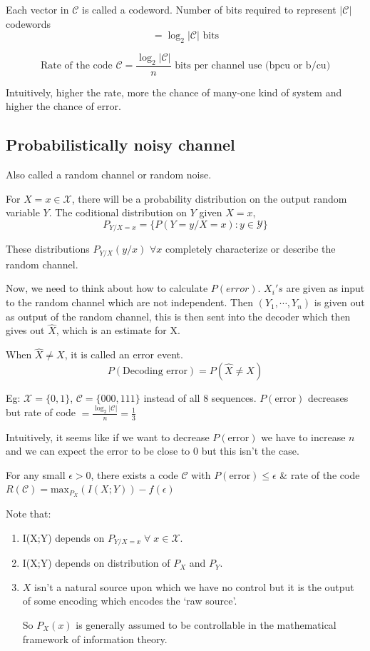 \documentclass{article}
\begin{document}
Each vector in $\mathscr{C}$ is called a codeword. Number of bits required to represent $|\mathscr{C}|$ codewords
$$ = \log_{2} | \mathscr{C} | \text{ bits}$$

$$ \text{Rate of the code } \mathscr{C}= \frac{\log_2 | \mathscr{C}|}{n} \text{ bits per channel use (bpcu or b/cu)}$$

Intuitively, higher the rate, more the chance of many-one kind of system and higher the chance of error.

\subsection{Probabilistically noisy channel}

Also called a random channel or random noise.

For $X=x \in \mathcal{X}$, there will be a probability distribution on the output random variable $Y$. The coditional distribution on $Y$ given $X=x$,
$$ P_{Y/X=x}= \{ P(Y=y/X=x):y \in \mathcal{Y}\}$$

These distributions $P_{Y/X}(y/x)$ $\forall x$ completely characterize or describe the random channel.

Now, we need to think about how to calculate $P(error)$. $X_i's$ are given as input to the random channel which are not independent. Then $(Y_1,\cdots, Y_n)$ is given out as output of the random channel, this is then sent into the decoder which then gives out $\hat{X}$, which is an estimate for X.

When $\hat{X} \neq X$, it is called an error event.
$$ P(\text{Decoding error})= P(\hat{X} \neq X)$$

Eg: $\mathcal{X}= \{ 0,1 \}$, $\mathscr{C}= \{ 000,111\}$ instead of all 8 sequences.
$P(\text{error})$ decreases but rate of code $= \frac{\log_2 |\mathscr{C}|}{n}= \frac{1}{3}$

Intuitively, it seems like if we want to decrease $P(\text{error})$ we have to increase $n$ and we can expect the error to be close to 0 but this isn't the case.

For any small $\epsilon > 0$, there exists a code $\mathscr{C}$ with $P(\text{error}) \leq \epsilon$ \& rate of the code $R(\mathscr{C})= \text{max}_{P_X} (I(X;Y))- f(\epsilon)$

Note that:
\begin{enumerate}
    \item I(X;Y) depends on $P_{Y/X=x} \; \forall \; x \in \mathcal{X}$.
    \item I(X;Y) depends on distribution of $P_X$ and $P_Y$.
    \item $X$ isn't a natural source upon which we have no control but it is the output of some encoding which encodes the `raw source'.

    So $P_X(x)$ is generally assumed to be controllable in the mathematical framework of information theory.
\end{enumerate}
\end{document}
